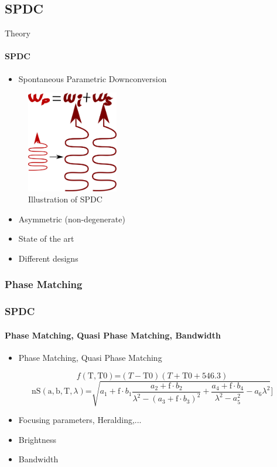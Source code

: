 \documentclass[serif,8pt]{beamer}
\begin{document}
{{\subsection{SPDC}
\begin{frame}{Theory}
	\framesubtitle{SPDC}
		\begin{itemize}
			\item Spontaneous Parametric Downconversion
				\pause
		\end{itemize}

		\begin{figure}
			\begin{center}
				\includegraphics[width=4cm]{SPDC.png}
			\end{center}
			\caption{Illustration of SPDC}\label{fig:}
		\end{figure}
		\begin{itemize}
			\pause
			\item Asymmetric (non-degenerate)
			\item State of the art
			\item Different designs
		\end{itemize}
		
\end{frame}

\subsubsection{Phase Matching}
\begin{frame}
	\frametitle{SPDC}
	\framesubtitle{Phase Matching, Quasi Phase Matching, Bandwidth}
	\begin{itemize}
		\item Phase Matching, Quasi Phase Matching
	\end{itemize}
	\begin{equation}
	f(\text{T},\text{T0})\text{=}(T-\text{T0}) (T+\text{T0}+546.3)
		\label{eq:Temperature_Dependance}
	\end{equation}
	\begin{equation}
		\text{nS}(\text{a},\text{b},\text{T},\lambda)\text{=}\sqrt{ a_1+\text{f}\cdot b_1\frac{a_2+\text{f} \cdot b_2}{\lambda ^2-(a_3+\text{f} \cdot b_3)^2}+\frac{a_4+\text{f} \cdot b_4}{\lambda ^2-a_5^2}-a_6\lambda ^2}]
		\label{eq:Refractive_Index}
	\end{equation}
	\begin{itemize}
		\item Focusing parameters, Heralding,...
		\item Brightness
		\item Bandwidth
	\end{itemize}
\end{frame}

}}
\end{document}
